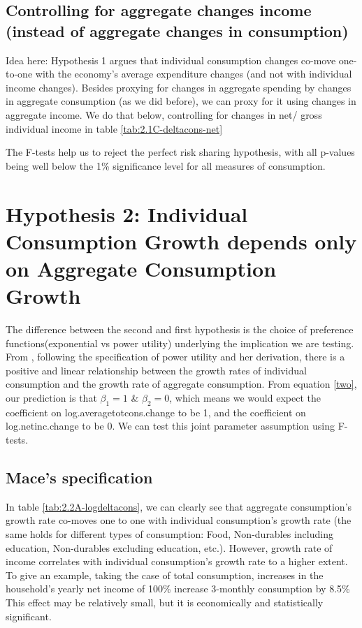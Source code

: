 \documentclass[12pt,a4paper]{article}
\begin{document}


\subsection*{Controlling for aggregate changes income (instead of aggregate changes in consumption)}

Idea here: Hypothesis 1 argues that individual consumption changes co-move one-to-one with the economy's average expenditure changes (and not with individual income changes). Besides proxying for changes in aggregate spending by changes in aggregate consumption (as we did before), we can proxy for it using changes in aggregate income. We do that below, controlling for changes in net/ gross individual income in table \ref{tab:2.1C-deltacons-net}



The F-tests help us to reject the perfect risk sharing hypothesis, with all p-values being well below the 1\% significance level for all measures of consumption. 

\section*{Hypothesis 2: Individual Consumption Growth depends only on Aggregate Consumption Growth}
The difference between the second and first hypothesis is the choice of preference functions(exponential vs power utility) underlying the implication we are testing. From \citealp{mace1991}, following the specification of power utility and her derivation, there is a positive and linear relationship between the growth rates of individual consumption and the growth rate of aggregate consumption. From equation \eqref{two}, our prediction is that $\beta_1=1$ \& $\beta_2=0$, which means we would expect the coefficient on log.averagetotcons.change to be 1, and the coefficient on log.netinc.change to be 0. We can test this joint parameter assumption using F-tests.

\subsection*{Mace's specification}

In table \ref{tab:2.2A-logdeltacons}, we can clearly see that aggregate consumption's growth rate co-moves one to one with individual consumption's growth rate (the same holds for different types of consumption: Food, Non-durables including education, Non-durables excluding education, etc.). However,  growth rate of income correlates with individual consumption's growth rate to a higher extent. To give an example, taking the case of total consumption, increases in the household's yearly net income of 100\% increase 3-monthly consumption by 8.5\% This effect may be relatively small, but it is economically and statistically significant.  \\
\end{document}
